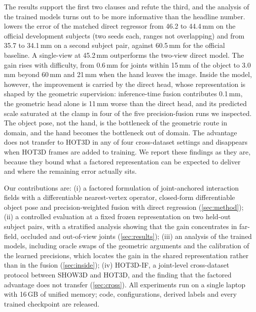 The results support the first two clauses and refute the third, and the analysis of the trained models turns out to be more informative than the headline number. \method{} lowers the error of the matched direct regressor from 46.2 to 44.4\,mm on the official development subjects (two seeds each, ranges not overlapping) and from 35.7 to 34.1\,mm on a second subject pair, against 60.5\,mm for the official baseline. A single-view \method{} at 45.2\,mm outperforms the two-view direct model. The gain rises with difficulty, from 0.6\,mm for joints within 15\,mm of the object to 3.0\,mm beyond 60\,mm and 21\,mm when the hand leaves the image. Inside the model, however, the improvement is carried by the direct head, whose representation is shaped by the geometric supervision: inference-time fusion contributes 0.1\,mm, the geometric head alone is 11\,mm worse than the direct head, and its predicted scale saturated at the clamp in four of the five precision-fusion runs we inspected. The object pose, not the hand, is the bottleneck of the geometric route in domain, and the hand becomes the bottleneck out of domain. The advantage does not transfer to HOT3D in any of four cross-dataset settings and disappears when HOT3D frames are added to training. We report these findings as they are, because they bound what a factored representation can be expected to deliver and where the remaining error actually sits.

Our contributions are:
(i) a factored formulation of joint-anchored interaction fields with a differentiable nearest-vertex operator, closed-form differentiable object pose and precision-weighted fusion with direct regression (\cref{sec:method});
(ii) a controlled evaluation at a fixed frozen representation on two held-out subject pairs, with a stratified analysis showing that the gain concentrates in far-field, occluded and out-of-view joints (\cref{sec:results});
(iii) an analysis of the trained models, including oracle swaps of the geometric arguments and the calibration of the learned precisions, which locates the gain in the shared representation rather than in the fusion (\cref{sec:inside});
(iv) HOT3D-IF, a joint-level cross-dataset protocol between SHOW3D and HOT3D, and the finding that the factored advantage does not transfer (\cref{sec:cross}).
All experiments run on a single laptop with 16\,GB of unified memory; code, configurations, derived labels and every trained checkpoint are released.
